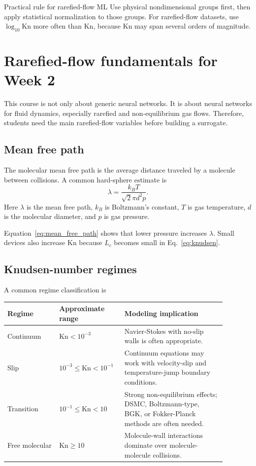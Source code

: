 \documentclass[11pt]{article}
\newcommand{\kn}{\mathrm{Kn}}
\begin{document}
\begin{keybox}{Practical rule for rarefied-flow ML}
Use physical nondimensional groups first, then apply statistical normalization to those groups.  For rarefied-flow datasets, use $\log_{10}\kn$ more often than $\kn$, because $\kn$ may span several orders of magnitude.
\end{keybox}

\section{Rarefied-flow fundamentals for Week 2}

This course is not only about generic neural networks.  It is about neural networks for fluid dynamics, especially rarefied and non-equilibrium gas flows.  Therefore, students need the main rarefied-flow variables before building a surrogate.

\subsection{Mean free path}

The molecular mean free path is the average distance traveled by a molecule between collisions.  A common hard-sphere estimate is
\begin{equation}
    \lambda = \frac{k_B T}{\sqrt{2}\pi d^2 p}.
    \label{eq:mean_free_path}
\end{equation}
Here $\lambda$ is the mean free path, $k_B$ is Boltzmann's constant, $T$ is gas temperature, $d$ is the molecular diameter, and $p$ is gas pressure.

Equation~\eqref{eq:mean_free_path} shows that lower pressure increases $\lambda$.  Small devices also increase $\kn$ because $L_c$ becomes small in Eq.~\eqref{eq:knudsen}.

\subsection{Knudsen-number regimes}

A common regime classification is
\begin{center}
\begin{tabular}{p{0.22\linewidth}p{0.23\linewidth}p{0.43\linewidth}}
\toprule
Regime & Approximate range & Modeling implication \\
\midrule
Continuum & $\kn<10^{-3}$ & Navier-Stokes with no-slip walls is often appropriate. \\
Slip & $10^{-3}\le \kn<10^{-1}$ & Continuum equations may work with velocity-slip and temperature-jump boundary conditions. \\
Transition & $10^{-1}\le \kn<10$ & Strong non-equilibrium effects; DSMC, Boltzmann-type, BGK, or Fokker-Planck methods are often needed. \\
Free molecular & $\kn\ge 10$ & Molecule-wall interactions dominate over molecule-molecule collisions. \\
\bottomrule
\end{tabular}
\end{center}
\end{document}
